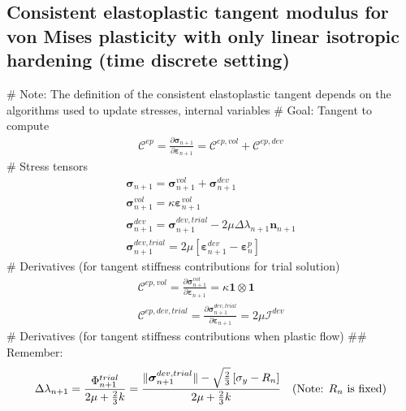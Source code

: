 \documentclass[]{scrartcl}
\begin{document}
\subsection{Consistent elastoplastic tangent modulus for von Mises plasticity with only linear isotropic hardening (time discrete setting)}
\begin{easylist}
# Note: The definition of the consistent elastoplastic tangent depends on the algorithms used to update stresses, internal variables
# Goal: Tangent to compute
\begin{gather}
 \boldsymbol{\mathcal{C}}^{ep} 
  = \frac{\partial \boldsymbol{\sigma}_{n+1}}{\partial \boldsymbol{\varepsilon}_{n+1}}
  = \boldsymbol{\mathcal{C}}^{ep, vol} + \boldsymbol{\mathcal{C}}^{ep, dev}
\label{equ: Constutitve law: Algorithmically correct tangent}
\end{gather}
# Stress tensors
\begin{gather*}
\boldsymbol{\sigma}_{n+1}
  = \boldsymbol{\sigma}^{vol}_{n+1} + \boldsymbol{\sigma}^{dev}_{n+1} \\
\boldsymbol{\sigma}^{vol}_{n+1}
  = \kappa \boldsymbol{\varepsilon}^{vol}_{n+1} \\
\boldsymbol{\sigma}^{dev}_{n+1}
  = \boldsymbol{\sigma}^{dev, trial}_{n+1}
  - 2 \mu \Delta \lambda_{n+1} \boldsymbol{n}_{n+1} \\
\boldsymbol{\sigma}^{dev, trial}_{n+1}
  = 2 \mu \left[ \boldsymbol{\varepsilon}^{dev}_{n+1} - \boldsymbol{\varepsilon}^{p}_{n} \right]
\end{gather*}
# Derivatives (for tangent stiffness contributions for trial solution)
\begin{gather*}
\boldsymbol{\mathcal{C}}^{ep, vol}
  = \frac{\partial \boldsymbol{\sigma}^{vol}_{n+1}}{\partial \boldsymbol{\varepsilon}_{n+1}}
  = \kappa \boldsymbol{1} \otimes \boldsymbol{1} \\
\boldsymbol{\mathcal{C}}^{ep, dev, trial}
  = \frac{\partial \boldsymbol{\sigma}^{dev, trial}_{n+1}}{\partial \boldsymbol{\varepsilon}_{n+1}}
  = 2 \mu \boldsymbol{\mathcal{I}}^{dev}
\end{gather*}
# Derivatives (for tangent stiffness contributions when plastic flow)
## Remember:
\begin{gather*}
\Delta \lambda_{n+1}
  = \frac{\Phi^{trial}_{n+1}}{2 \mu + \frac{2}{3} k}
  = \frac{\Vert \boldsymbol{\sigma}^{dev, trial}_{n+1} \Vert - \sqrt{\frac{2}{3}} \left[ \sigma_{y} - R_{n} \right]}{2 \mu + \frac{2}{3} k}
\quad \textnormal{(Note: $R_{n}$ is fixed)} \\

\end{gather*}
\end{easylist}
\end{document}
